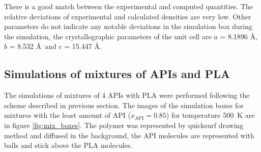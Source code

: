 There is a good match between the experimental and computed quantities. The relative deviations of experimental and calculated densities are very low. Other parameters do not indicate any notable deviations in the simulation box during the simulation, the crystallographic parameters of the unit cell are $a$ = 8.1896 \AA, $b$ = 8.532 \AA~and  $c$ = 15.447 \AA. 

\subsection{Simulations of mixtures of APIs and PLA}
The simulations of mixtures of 4 APIs with PLA were performed following the scheme described in previous section. The images of the simulation boxes for mixtures with the least amount of API ($x_{\text{API}}=0.85$) for temperature 500~K are in figure \ref{fig:mix_boxes}. The polymer was represented by quicksurf drawing method and diffused in the background, the API molecules are represented with balls and stick above the PLA molecules.


